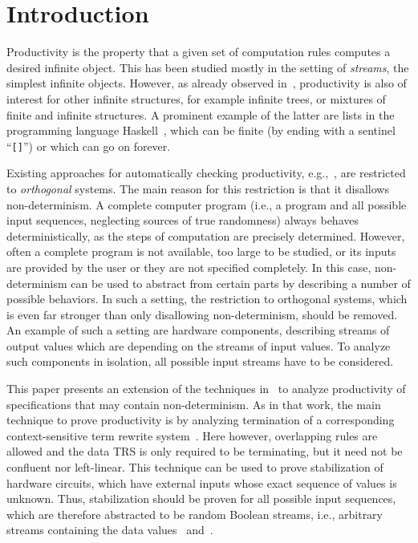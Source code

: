 \documentclass{eptcs}
\begin{document}
\section{Introduction}
\label{sec:Introduction}

Productivity is the property that a given set of computation rules computes a
desired infinite object. This has been studied mostly in the setting of
\emph{streams}, the simplest infinite objects. However, as already observed
in~\cite{ZR10}, productivity is also of interest for other infinite structures,
for example infinite trees, or mixtures of finite and infinite structures.
A prominent example of the latter are lists in the programming language
\textsf{Haskell}~\cite{Haskell98}, which can be finite (by ending with a
sentinel ``\texttt{[]}'') or which can go on forever.

Existing approaches for automatically checking productivity,
e.g.,~\cite{End10,EGH08,ZR10},
are restricted to \emph{orthogonal} systems. The main reason for this
restriction is that it disallows non-determinism. A complete computer program
(i.e., a program and all possible input sequences, neglecting sources of true
randomness) always behaves deterministically, as the steps of computation are
precisely determined.
However, often a complete program is not available, too large to be studied, or
its inputs are provided by the user or they are not specified completely.
In this case, non-determinism can be used to abstract from certain parts by
describing a number of possible behaviors. In such a setting, the restriction to
orthogonal systems, which is even far stronger than only disallowing
non-determinism, should be removed.
An example of such a setting are hardware components, describing streams of
output values which are depending on the streams of input values. To analyze
such components in isolation, all possible input streams have to be considered.

This paper presents an extension of the techniques in~\cite{ZR10} to analyze
productivity of specifications that may contain non-determinism.
As in that work, the main technique to prove productivity is by analyzing
termination of a corresponding context-sensitive term rewrite system~\cite{L98}.
Here however, overlapping rules are allowed and the data TRS is only required to
be terminating, but it need not be confluent nor left-linear.
This technique can be used to prove stabilization of hardware circuits,
which have external inputs whose exact sequence of values is unknown.
Thus, stabilization should be proven for all possible input sequences, which are
therefore abstracted to be random Boolean streams, i.e., arbitrary streams
containing the data values~ and~.
\end{document}
